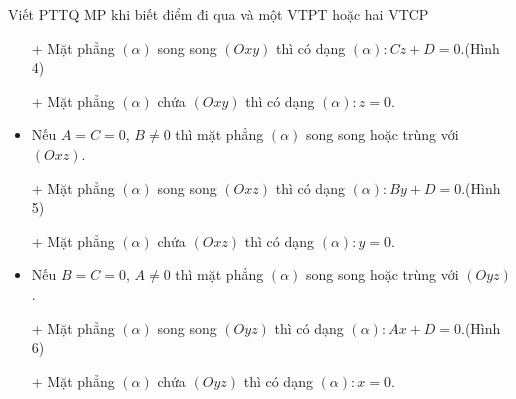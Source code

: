 \begin{dang}{Viết PTTQ MP khi biết điểm đi qua và một VTPT hoặc hai VTCP}
\begin{enumerate}[a.]
\begin{itemize}
			\item[+] Mặt phẳng $\left(\alpha\right)$ song song $\left(Oxy\right)$ thì có dạng $\left(\alpha\right) \colon Cz+D=0$.(Hình 4)
			\item[+] Mặt phẳng $\left(\alpha\right)$ chứa $\left(Oxy\right)$ thì có dạng $\left(\alpha\right) \colon z=0$.
			\item Nếu $A=C= 0$, $B \neq 0$ thì mặt phẳng $\left(\alpha\right)$ song song hoặc trùng với $\left(Oxz\right)$.
			\item[+] Mặt phẳng $\left(\alpha\right)$ song song $\left(Oxz\right)$ thì có dạng $\left(\alpha\right) \colon By+D=0$.(Hình 5)
			\item[+] Mặt phẳng $\left(\alpha\right)$ chứa $\left(Oxz\right)$ thì có dạng $\left(\alpha\right) \colon y=0$.
			\item Nếu $B=C= 0$, $A \neq 0$ thì mặt phẳng $\left(\alpha\right)$ song song hoặc trùng với $\left(Oyz\right)$.
			\item[+] Mặt phẳng $\left(\alpha\right)$ song song $\left(Oyz\right)$ thì có dạng $\left(\alpha\right) \colon Ax+D=0$.(Hình 6)
			\item[+] Mặt phẳng $\left(\alpha\right)$ chứa $\left(Oyz\right)$ thì có dạng $\left(\alpha\right) \colon x=0$.
		\end{itemize}
		

\end{enumerate}
\end{dang}
